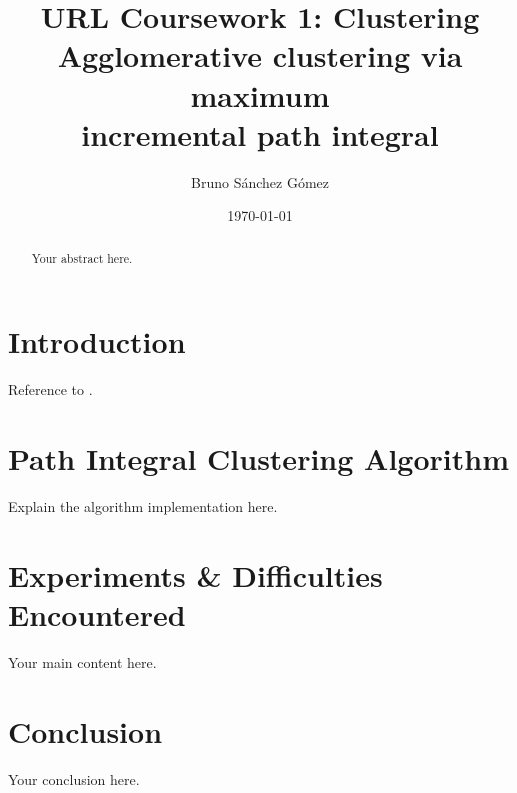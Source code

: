 \documentclass[a4paper,12pt]{article}
\title{URL Coursework 1: Clustering \\ \Large{Agglomerative clustering via maximum \\ incremental path integral}}
\author{Bruno Sánchez Gómez}
\date{\today}
\begin{document}
\maketitle

\begin{abstract}
Your abstract here.
\end{abstract}

\tableofcontents
\newpage
{}

\section{Introduction}
Reference to \cite{PIC}.

\section{Path Integral Clustering Algorithm}
Explain the algorithm implementation here.

\section{Experiments \& Difficulties Encountered}
Your main content here.

\section{Conclusion}
Your conclusion here.



\end{document}
